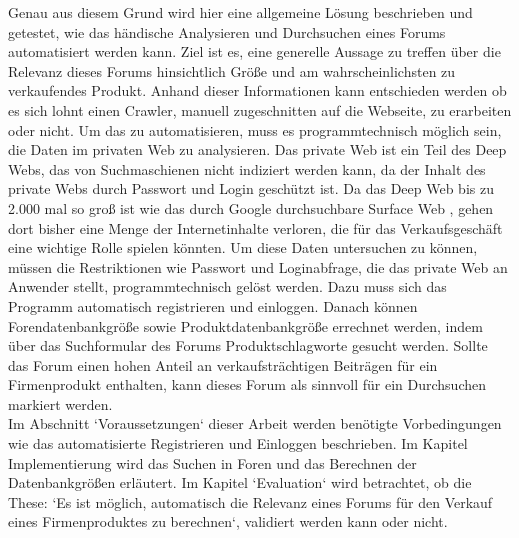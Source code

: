 Genau aus diesem Grund wird hier eine allgemeine Lösung beschrieben und getestet, wie das händische Analysieren und Durchsuchen eines Forums automatisiert werden kann. Ziel ist es, eine generelle Aussage zu treffen über die Relevanz dieses Forums hinsichtlich Größe und am wahrscheinlichsten zu verkaufendes Produkt. Anhand dieser Informationen kann entschieden werden ob es sich lohnt einen Crawler, manuell zugeschnitten auf die Webseite, zu erarbeiten oder nicht.
Um das zu automatisieren, muss es programmtechnisch möglich sein, die Daten im privaten Web zu analysieren. Das private Web ist ein Teil des Deep Webs, das von Suchmaschienen nicht indiziert werden kann, da der Inhalt des private Webs durch Passwort und Login geschützt ist. Da das Deep Web bis zu 2.000 mal so groß ist wie das durch Google durchsuchbare Surface Web \cite{gupta2014comparative}, gehen dort bisher eine Menge der Internetinhalte verloren, die für das Verkaufsgeschäft eine wichtige Rolle spielen könnten. Um diese Daten untersuchen zu können, müssen die Restriktionen wie Passwort und Loginabfrage, die das private Web an Anwender stellt, programmtechnisch gelöst werden. Dazu muss sich das Programm automatisch registrieren und einloggen. Danach können Forendatenbankgröße sowie Produktdatenbankgröße errechnet werden, indem über das Suchformular des Forums Produktschlagworte gesucht werden. Sollte das Forum einen hohen Anteil an verkaufsträchtigen Beiträgen für ein Firmenprodukt enthalten, kann dieses Forum als sinnvoll für ein Durchsuchen markiert werden.\\
Im Abschnitt `Voraussetzungen` dieser Arbeit werden benötigte Vorbedingungen wie das automatisierte Registrieren und Einloggen beschrieben. Im Kapitel Implementierung wird das Suchen in Foren und das Berechnen der Datenbankgrößen erläutert. Im Kapitel `Evaluation` wird betrachtet, ob die These: `Es ist möglich, automatisch die Relevanz eines Forums für den Verkauf eines Firmenproduktes zu berechnen`, validiert werden kann oder nicht.
\newpage
